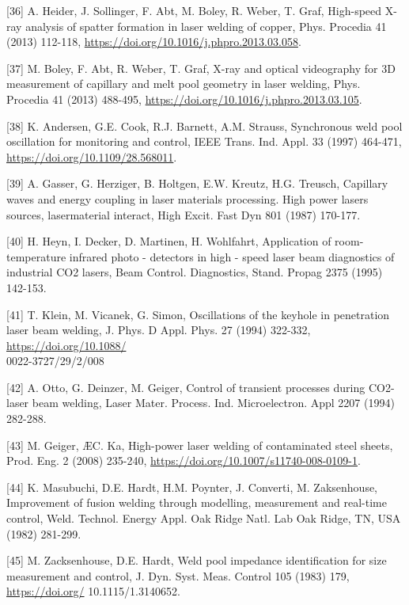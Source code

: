 \documentclass[10pt]{article}
\begin{document}
[36] A. Heider, J. Sollinger, F. Abt, M. Boley, R. Weber, T. Graf, High-speed X-ray analysis of spatter formation in laser welding of copper, Phys. Procedia 41 (2013) 112-118, \href{https://doi.org/10.1016/j.phpro.2013.03.058}{https://doi.org/10.1016/j.phpro.2013.03.058}.

[37] M. Boley, F. Abt, R. Weber, T. Graf, X-ray and optical videography for 3D measurement of capillary and melt pool geometry in laser welding, Phys. Procedia 41 (2013) 488-495, \href{https://doi.org/10.1016/j.phpro.2013.03.105}{https://doi.org/10.1016/j.phpro.2013.03.105}.

[38] K. Andersen, G.E. Cook, R.J. Barnett, A.M. Strauss, Synchronous weld pool oscillation for monitoring and control, IEEE Trans. Ind. Appl. 33 (1997) 464-471, \href{https://doi.org/10.1109/28.568011}{https://doi.org/10.1109/28.568011}.

[39] A. Gasser, G. Herziger, B. Holtgen, E.W. Kreutz, H.G. Treusch, Capillary waves and energy coupling in laser materials processing. High power lasers sources, lasermaterial interact, High Excit. Fast Dyn 801 (1987) 170-177.

[40] H. Heyn, I. Decker, D. Martinen, H. Wohlfahrt, Application of room-temperature infrared photo - detectors in high - speed laser beam diagnostics of industrial CO2 lasers, Beam Control. Diagnostics, Stand. Propag 2375 (1995) 142-153.

[41] T. Klein, M. Vicanek, G. Simon, Oscillations of the keyhole in penetration laser beam welding, J. Phys. D Appl. Phys. 27 (1994) 322-332, \href{https://doi.org/10.1088/}{https://doi.org/10.1088/}\\
0022-3727/29/2/008

[42] A. Otto, G. Deinzer, M. Geiger, Control of transient processes during CO2-laser beam welding, Laser Mater. Process. Ind. Microelectron. Appl 2207 (1994) 282-288.

[43] M. Geiger, ÆC. Ka, High-power laser welding of contaminated steel sheets, Prod. Eng. 2 (2008) 235-240, \href{https://doi.org/10.1007/s11740-008-0109-1}{https://doi.org/10.1007/s11740-008-0109-1}.

[44] K. Masubuchi, D.E. Hardt, H.M. Poynter, J. Converti, M. Zaksenhouse, Improvement of fusion welding through modelling, measurement and real-time control, Weld. Technol. Energy Appl. Oak Ridge Natl. Lab Oak Ridge, TN, USA (1982) 281-299.

[45] M. Zacksenhouse, D.E. Hardt, Weld pool impedance identification for size measurement and control, J. Dyn. Syst. Meas. Control 105 (1983) 179, \href{https://doi.org/}{https://doi.org/} 10.1115/1.3140652.
\end{document}
